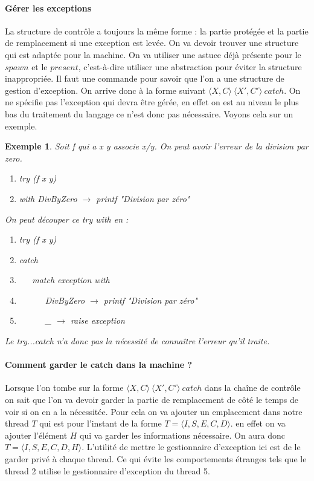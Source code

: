 \documentclass[10pt,a4paper]{report}
\newtheorem{ex}{Exemple}
\begin{document}
	\paragraph{Gérer les exceptions}
	La structure de contrôle a toujours la même forme : la partie protégée et la partie de remplacement si une exception est levée. On va devoir trouver une structure qui est adaptée pour la machine. On va utiliser une astuce déjà présente pour le $spawn$ et le $present$, c'est-à-dire utiliser une abstraction pour éviter la structure inappropriée. Il faut une commande pour savoir que l'on a une structure de gestion d'exception. On arrive donc à la forme suivant $\langle X,C\rangle~\langle X',C'\rangle~catch$. On ne spécifie pas l'exception qui devra être gérée, en effet on est au niveau le plus bas du traitement du langage ce n'est donc pas nécessaire. Voyons cela sur un exemple.
	\begin{ex}
		Soit f qui a x y associe x/y. On peut avoir l'erreur de la division par zero.
		\smallbreak
		\begin{enumerate}
			\item try (f x y)
			\item with DivByZero $\rightarrow$ printf "Division par zéro"
		\end{enumerate}
		\medbreak
		
		
		On peut découper ce try with en :
		\smallbreak
		\begin{enumerate}
			\item try (f x y)
			\item catch
			\item ~~~match exception with 
			\item ~~~~~~DivByZero $\rightarrow$ printf "Division par zéro"
			\item ~~~~~~\_ $\rightarrow$ raise exception
		\end{enumerate}
		\medbreak
		
		Le try...catch n'a donc pas la nécessité de connaître l'erreur qu'il traite.
	\end{ex}
	
	\medbreak
	
	\paragraph{Comment garder le catch dans la machine ?} 
	Lorsque l'on tombe sur la forme $\langle X,C\rangle~\langle X',C'\rangle~catch$ dans la chaîne de contrôle on sait que l'on va devoir garder la partie de remplacement de côté le temps de voir si on en a la nécessitée. Pour cela on va ajouter un emplacement dans notre thread $T$ qui est pour l'instant de la forme $T = \langle I,S,E,C,D\rangle$. en effet on va ajouter l'élément $H$ qui va garder les informations nécessaire. On aura donc $T = \langle I,S,E,C,D,H\rangle$. L'utilité de mettre le gestionnaire d'exception ici est de le garder privé à chaque thread. Ce qui évite les comportements étranges tels que le thread 2 utilise le gestionnaire d'exception du thread 5.
	\medbreak
	
\end{document}
